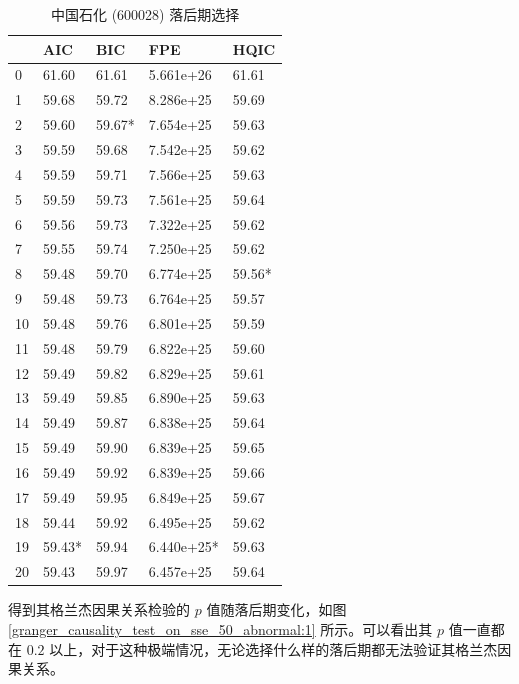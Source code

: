 \begin{table}
  \centering
  \caption{中国石化 (600028) 落后期选择}
  \label{granger_causality_test_on_sse_50_abnormal:0}
  \begin{tabularx}{0.75\textwidth}{XXXXX}
    \toprule
    & AIC & BIC & FPE & HQIC \\
    \midrule
      0 & 61.60 & 61.61 & 5.661e+26 & 61.61 \\
      1 & 59.68 & 59.72 & 8.286e+25 & 59.69 \\
      2 & 59.60 & 59.67* & 7.654e+25 & 59.63 \\
      3 & 59.59 & 59.68 & 7.542e+25 & 59.62 \\
      4 & 59.59 & 59.71 & 7.566e+25 & 59.63 \\
      5 & 59.59 & 59.73 & 7.561e+25 & 59.64 \\
      6 & 59.56 & 59.73 & 7.322e+25 & 59.62 \\
      7 & 59.55 & 59.74 & 7.250e+25 & 59.62 \\
      8 & 59.48 & 59.70 & 6.774e+25 & 59.56* \\
      9 & 59.48 & 59.73 & 6.764e+25 & 59.57 \\
      10 & 59.48 & 59.76 & 6.801e+25 & 59.59 \\
      11 & 59.48 & 59.79 & 6.822e+25 & 59.60 \\
      12 & 59.49 & 59.82 & 6.829e+25 & 59.61 \\
      13 & 59.49 & 59.85 & 6.890e+25 & 59.63 \\
      14 & 59.49 & 59.87 & 6.838e+25 & 59.64 \\
      15 & 59.49 & 59.90 & 6.839e+25 & 59.65 \\
      16 & 59.49 & 59.92 & 6.839e+25 & 59.66 \\
      17 & 59.49 & 59.95 & 6.849e+25 & 59.67 \\
      18 & 59.44 & 59.92 & 6.495e+25 & 59.62 \\
      19 & 59.43* & 59.94 & 6.440e+25* & 59.63 \\
      20 & 59.43 & 59.97 & 6.457e+25 & 59.64 \\
    \bottomrule
  \end{tabularx}
\end{table}

得到其格兰杰因果关系检验的 $p$ 值随落后期变化，如图 \ref{granger_causality_test_on_sse_50_abnormal:1} 所示。可以看出其 $p$ 值一直都在 $0.2$ 以上，对于这种极端情况，无论选择什么样的落后期都无法验证其格兰杰因果关系。

